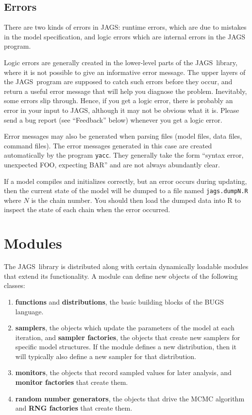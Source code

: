 \documentclass[11pt, a4paper, titlepage]{report}
\newcommand{\JAGS}{\textsf{JAGS}}
\begin{document}
\section{Errors}

There are two kinds of errors in \JAGS: runtime errors, which are due to
mistakes in the model specification, and logic errors which are internal
errors in the JAGS program. 

Logic errors are generally created in the lower-level parts of the \JAGS\
library, where it is not possible to give an informative error message.
The upper layers of the \JAGS\ program are supposed to catch such errors
before they occur, and return a useful error message that will help you
diagnose the problem.  Inevitably, some errors slip through. Hence,
if you get a logic error, there is probably an error in your input to
\JAGS, although it may not be obvious what it is. Please send a bug
report (see ``Feedback'' below) whenever you get a logic error.

Error messages may also be generated when parsing files (model files,
data files, command files).  The error messages generated in this case
are created automatically by the program \texttt{yacc}. They
generally take the form ``syntax error, unexpected FOO, expecting BAR''
and are not always abundantly clear.

If a model compiles and initializes correctly, but an error occurs
during updating, then the current state of the model will be dumped
to a file named \verb+jags.dumpN.R+ where $N$ is the chain number.
You should then load the dumped data into R to inspect the state of
each chain when the error occurred.

\chapter{Modules}
\label{section:modules}

The \JAGS\  library is distributed along with certain dynamically
loadable modules that extend its functionality. A module can define
new objects of the following classes:
\begin{enumerate}
\item {\bf functions} and {\bf distributions}, the basic building
blocks of the BUGS language.
\item {\bf samplers}, the objects which update the parameters of the
model at each iteration, and {\bf sampler factories}, the objects that 
create new samplers for specific model structures.  If the module
defines a new distribution, then it will typically also define a new
sampler for that distribution.
\item {\bf monitors}, the objects that record sampled values for
later analysis, and {\bf monitor factories} that create them. 
\item {\bf random number generators}, the objects that drive the
MCMC algorithm and {\bf RNG factories} that create them.
\end{enumerate}
\end{document}
